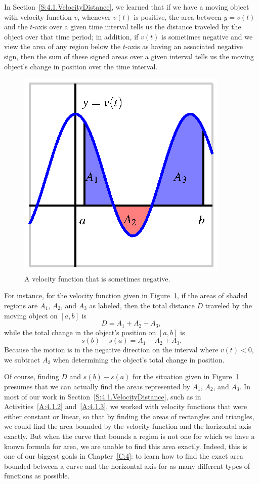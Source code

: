 In Section~\ref{S:4.1.VelocityDistance}, we learned that if we have a moving object with velocity function $v$, whenever $v(t)$ is positive, the area between $y = v(t)$ and the $t$-axis over a given time interval tells us the distance traveled by the object over that time period; in addition, if $v(t)$ is sometimes negative and we view the area of any region below the $t$-axis as having an associated negative sign, then the sum of these signed areas over a given interval tells us the moving object's change in position over the time interval.
\begin{figure}[h]
\begin{center}
\includegraphics{figures/4_2_Intro.eps}
\caption{A velocity function that is sometimes negative.} \label{F:4.2.Intro}
\end{center}
\end{figure}
For instance, for the velocity function given in Figure~\ref{F:4.2.Intro}, if the areas of shaded regions are $A_1$, $A_2$, and $A_3$ as labeled, then the total distance $D$ traveled by the moving object on $[a,b]$ is 
$$D = A_1 + A_2 + A_3,$$
while the total change in the object's position on $[a,b]$ is 
$$s(b) - s(a) = A_1 - A_2 + A_3.$$
Because the motion is in the negative direction on the interval where $v(t) < 0$, we subtract $A_2$ when determining the object's total change in position.

Of course, finding $D$ and $s(b)-s(a)$ for the situation given in Figure~\ref{F:4.2.Intro} presumes that we can actually find the areas represented by $A_1$, $A_2$, and $A_3$.  In most of our work in Section~\ref{S:4.1.VelocityDistance}, such as in Activities~\ref{A:4.1.2} and~\ref{A:4.1.3}, we worked with velocity functions that were either constant or linear, so that by finding the areas of rectangles and triangles, we could find the area bounded by the velocity function and the horizontal axis exactly.  But when the curve that bounds a region is not one for which we have a known formula for area, we are unable to find this area exactly.  Indeed, this is one of our biggest goals in Chapter~\ref{C:4}: to learn how to find the exact area bounded between a curve and the horizontal axis for as many different types of functions as possible.  

